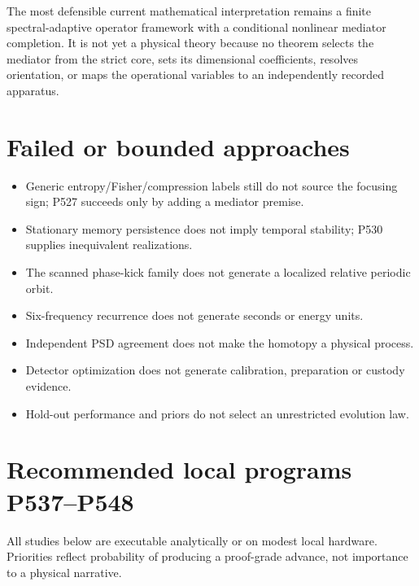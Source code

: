 \documentclass[11pt,a4paper]{article}
\begin{document}
The most defensible current mathematical interpretation remains a finite spectral-adaptive operator framework with a conditional nonlinear mediator completion. It is not yet a physical theory because no theorem selects the mediator from the strict core, sets its dimensional coefficients, resolves orientation, or maps the operational variables to an independently recorded apparatus.

\section{Failed or bounded approaches}

\begin{itemize}
\item Generic entropy/Fisher/compression labels still do not source the focusing sign; P527 succeeds only by adding a mediator premise.
\item Stationary memory persistence does not imply temporal stability; P530 supplies inequivalent realizations.
\item The scanned phase-kick family does not generate a localized relative periodic orbit.
\item Six-frequency recurrence does not generate seconds or energy units.
\item Independent PSD agreement does not make the homotopy a physical process.
\item Detector optimization does not generate calibration, preparation or custody evidence.
\item Hold-out performance and priors do not select an unrestricted evolution law.
\end{itemize}

\section{Recommended local programs P537--P548}

All studies below are executable analytically or on modest local hardware. Priorities reflect probability of producing a proof-grade advance, not importance to a physical narrative.
\end{document}
